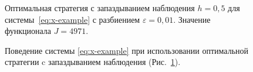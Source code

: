 \begin{figure}[bh]
        \noindent{}
        \caption{Оптимальная стратегия с запаздыванием наблюдения $h = 0,\!5$ для системы~\eqref{eq:x-example} с разбиением $\varepsilon = 0,\!01$. Значение функционала $J = 4971$.}
        \label{img:small-control}
\end{figure}
\begin{figure}[bh]
        \noindent{}
        \caption{Поведение системы \eqref{eq:x-example} при использовании оптимальной стратегии c запаздыванием наблюдения (Рис.~\ref{img:small-control}).}
        \label{img:small-tr}
\end{figure}
